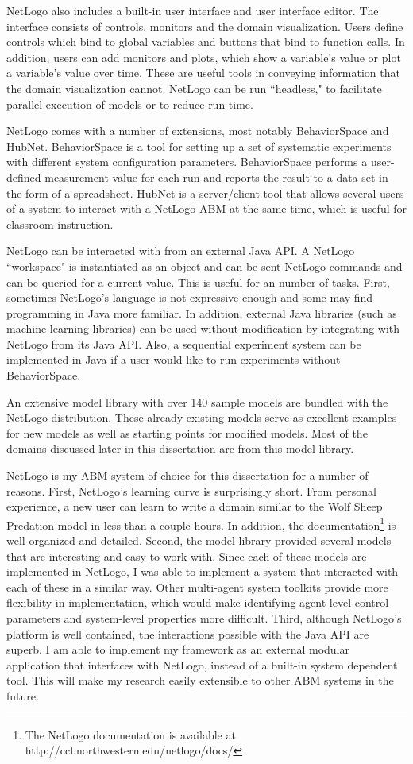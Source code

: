 NetLogo also includes a built-in user interface and user interface editor.
The interface consists of controls, monitors and the domain visualization.
Users define controls which bind to global variables and buttons that bind to function calls.
In addition, users can add monitors and plots, which show a variable's value or plot a variable's value over time.
These are useful tools in conveying information that the domain visualization cannot.
NetLogo can be run ``headless," to facilitate parallel execution of models or to reduce run-time.

NetLogo comes with a number of extensions, most notably BehaviorSpace and HubNet.
BehaviorSpace is a tool for setting up a set of systematic experiments with different system configuration parameters.
BehaviorSpace performs a user-defined measurement value for each run and reports the result to a data set in the form of a spreadsheet.
HubNet is a server/client tool that allows several users of a system to interact with a NetLogo ABM at the same time, which is useful for classroom instruction.

NetLogo can be interacted with from an external Java API.
A NetLogo ``workspace" is instantiated as an object and can be sent NetLogo commands and can be queried for a current value.
This is useful for an number of tasks.
First, sometimes NetLogo's language is not expressive enough and some may find programming in Java more familiar.
In addition, external Java libraries (such as machine learning libraries) can be used without modification by integrating with NetLogo from its Java API.
Also, a sequential experiment system can be implemented in Java if a user would like to run experiments without BehaviorSpace.

An extensive model library with over 140 sample models are bundled with the NetLogo distribution.
These already existing models serve as excellent examples for new models as well as starting points for modified models.
Most of the domains discussed later in this dissertation are from this model library.

NetLogo is my ABM system of choice for this dissertation for a number of reasons.
First, NetLogo's learning curve is surprisingly short.
From personal experience, a new user can learn to write a domain similar to the Wolf Sheep Predation model in less than a couple hours.
In addition, the documentation\footnote{The NetLogo documentation is available at http://ccl.northwestern.edu/netlogo/docs/} is well organized and detailed.
Second, the model library provided several models that are interesting and easy to work with.
Since each of these models are implemented in NetLogo, I was able to implement a system that interacted with each of these in a similar way.
Other multi-agent system toolkits provide more flexibility in implementation, which would make identifying agent-level control parameters and system-level properties more difficult.
Third, although NetLogo's platform is well contained, the interactions possible with the Java API are superb.
I am able to implement my framework as an external modular application that interfaces with NetLogo, instead of a built-in system dependent tool.
This will make my research easily extensible to other ABM systems in the future.

